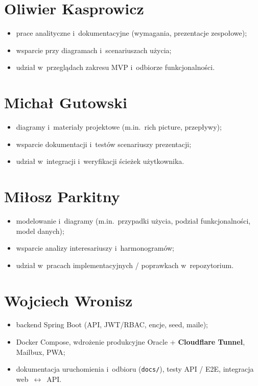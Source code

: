 \documentclass{sprz}
\begin{document}
\section{Oliwier Kasprowicz}  
\begin{itemize}  
 \item prace analityczne i~dokumentacyjne (wymagania, prezentacje zespołowe);  
 \item wsparcie przy diagramach i~scenariuszach użycia;  
 \item udział w~przeglądach zakresu MVP i~odbiorze funkcjonalności.  
\end{itemize}  
  
\section{Michał Gutowski}  
\begin{itemize}  
 \item diagramy i~materiały projektowe (m.in.\ rich picture, przepływy);  
 \item wsparcie dokumentacji i~testów scenariuszy prezentacji;  
 \item udział w~integracji i~weryfikacji ścieżek użytkownika.  
\end{itemize}  
  
\section{Miłosz Parkitny}  
\begin{itemize}  
 \item modelowanie i~diagramy (m.in.\ przypadki użycia, podział funkcjonalności, model danych);  
 \item wsparcie analizy interesariuszy i~harmonogramów;  
 \item udział w~pracach implementacyjnych / poprawkach w~repozytorium.  
\end{itemize}  
  
\section{Wojciech Wronisz}  
\begin{itemize}  
 \item backend Spring Boot (API, JWT/RBAC, encje, seed, maile);  
 \item Docker Compose, wdrożenie produkcyjne Oracle + \textbf{Cloudflare Tunnel}, Mailbux, PWA;  
 \item dokumentacja uruchomienia i~odbioru (\texttt{docs/}), testy API / E2E, integracja web~$\leftrightarrow$~API.  
\end{itemize}  
  
\end{document}
